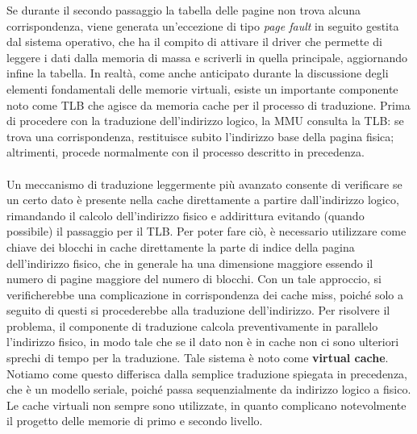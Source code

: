 Se durante il secondo passaggio la tabella delle pagine non trova alcuna corrispondenza, viene generata un'eccezione di tipo \textit{page fault} in seguito gestita dal sistema operativo, che ha il compito di attivare il driver che permette di leggere i dati dalla memoria di massa e scriverli in quella principale, aggiornando infine la tabella. In realtà, come anche anticipato durante la discussione degli elementi fondamentali delle memorie virtuali, esiste un importante componente noto come TLB che agisce da memoria cache per il processo di traduzione. Prima di procedere con la traduzione dell'indirizzo logico, la MMU consulta la TLB: se trova una corrispondenza, restituisce subito l'indirizzo base della pagina fisica; altrimenti, procede normalmente con il processo descritto in precedenza.
\\
\\
Un meccanismo di traduzione leggermente più avanzato consente di verificare se un certo dato è presente nella cache direttamente a partire dall'indirizzo logico, rimandando il calcolo dell'indirizzo fisico e addirittura evitando (quando possibile) il passaggio per il TLB. Per poter fare ciò, è necessario utilizzare come chiave dei blocchi in cache direttamente la parte di indice della pagina dell'indirizzo fisico, che in generale ha una dimensione maggiore essendo il numero di pagine maggiore del numero di blocchi. Con un tale approccio, si verificherebbe una complicazione in corrispondenza dei cache miss, poiché solo a seguito di questi si procederebbe alla traduzione dell'indirizzo. Per risolvere il problema, il componente di traduzione calcola preventivamente in parallelo l'indirizzo fisico, in modo tale che se il dato non è in cache non ci sono ulteriori sprechi di tempo per la traduzione. Tale sistema è noto come \textbf{virtual cache}. Notiamo come questo differisca dalla semplice traduzione spiegata in precedenza, che è un modello seriale, poiché passa sequenzialmente da indirizzo logico a fisico. Le cache virtuali non sempre sono utilizzate, in quanto complicano notevolmente il progetto delle memorie di primo e secondo livello.


